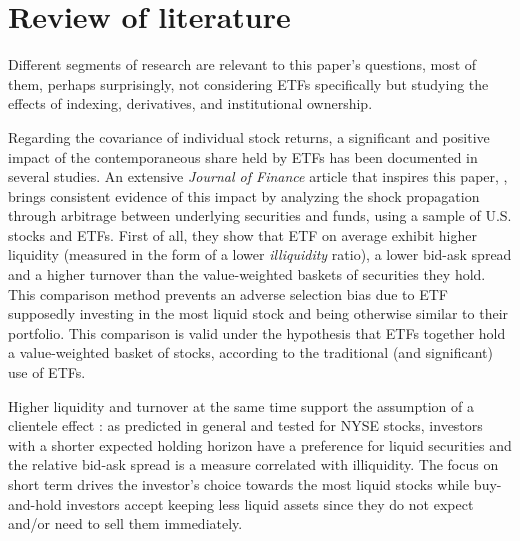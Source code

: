 \section{Review of literature}
\label{sec:Literature}
Different segments of research are relevant to this paper's questions, most of them, perhaps surprisingly, not considering ETFs specifically but studying the effects of indexing, derivatives, and institutional ownership.

Regarding the covariance of individual stock returns, a significant and positive impact of the contemporaneous share held by ETFs has been documented in several studies. An extensive \emph{Journal of Finance} article that inspires this paper, \textcite{Ben-David2018}, brings consistent evidence of this impact by analyzing the shock propagation through arbitrage between underlying securities and funds, using a sample of U.S. stocks and ETFs. First of all, they show that ETF on average exhibit higher liquidity (measured in the form of a lower \textcite{Amihud2002} \emph{illiquidity} ratio), a lower bid-ask spread and a higher turnover than the value-weighted baskets of securities they hold. This comparison method prevents an adverse selection bias due to ETF supposedly investing in the most liquid stock and being otherwise similar to their portfolio. This comparison is valid under the hypothesis that ETFs together hold a value-weighted basket of stocks, according to the traditional (and significant) use of ETFs.

Higher liquidity and turnover at the same time support the assumption of a clientele effect : as \textcite{Amihud1986} predicted in general and tested for NYSE stocks, investors with a shorter expected holding horizon have a preference for liquid securities and the relative bid-ask spread is a measure correlated with illiquidity. The focus on short term drives the investor's choice towards the most liquid stocks while buy-and-hold investors accept keeping less liquid assets since they do not expect and/or need to sell them immediately. 

